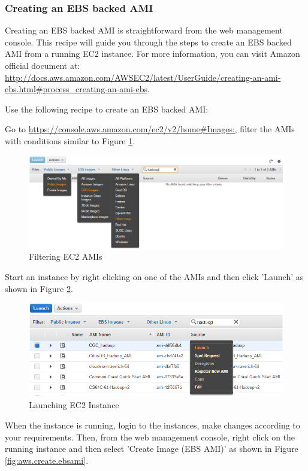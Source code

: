 \subsubsection*{Creating an EBS backed AMI}
Creating an EBS backed AMI is straightforward from the web management console. This recipe will guide you through the steps to create an EBS backed AMI from a running EC2 instance. For more information, you can visit Amazon official document at: \url{http://docs.aws.amazon.com/AWSEC2/latest/UserGuide/creating-an-ami-ebs.html#process_creating-an-ami-ebs}.

Use the following recipe to create an EBS backed AMI:

Go to \url{https://console.aws.amazon.com/ec2/v2/home#Images:}, filter the AMIs with conditions similar to Figure \ref{fig:aws.ec2.ami.filter}.
\begin{figure}[ht]
  \centering
  \includegraphics[width=.90\textwidth]{figs/5163os_08_29.png}
  \caption{Filtering EC2 AMIs}\label{fig:aws.ec2.ami.filter}
\end{figure} 
Start an instance by right clicking on one of the AMIs and then click 'Launch' as shown in Figure \ref{fig:aws.launch.instance}.
\begin{figure}[ht]
  \centering
  \includegraphics[width=.90\textwidth]{figs/5163os_08_30.png}
  \caption{Launching EC2 Instance}\label{fig:aws.launch.instance}
\end{figure} 
When the instance is running, login to the instances, make changes according to your requirements. Then, from the web management console, right click on the running instance and then select 'Create Image (EBS AMI)' as shown in Figure \ref{fig:aws.create.ebsami}.
